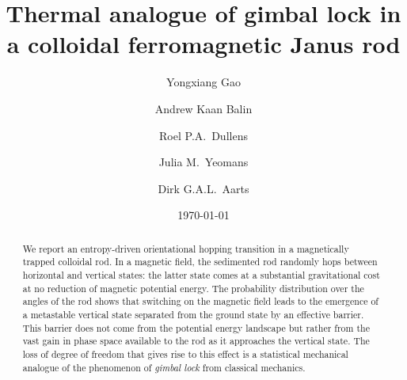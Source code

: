 \documentclass[aps,prl,reprint,twocolumn,superscriptaddress,showpacs]{revtex4-1}
\begin{document}
\title{Thermal analogue of gimbal lock in a colloidal ferromagnetic Janus rod}

\author{Yongxiang Gao}
\author{Andrew Kaan Balin}
\author{Roel P.A.\ Dullens}
\author{Julia M.\ Yeomans}
\author{Dirk G.A.L.\ Aarts}


\date{\today}

\begin{abstract} We report an entropy-driven orientational hopping transition in a magnetically trapped colloidal rod. In a magnetic field, the sedimented rod randomly hops between horizontal and vertical states: the latter state comes at a substantial gravitational cost at no reduction of magnetic potential energy. The probability distribution over the angles of the rod shows that switching on the magnetic field leads to the emergence of a metastable vertical state separated from the ground state by an effective barrier. This barrier does not come from the potential energy landscape but rather from the vast gain in phase space available to the rod as it approaches the vertical state. The loss of degree of freedom that gives rise to this effect is a statistical mechanical analogue of the phenomenon of \emph{gimbal lock} from classical mechanics.\end{abstract}





\maketitle
\end{document}
